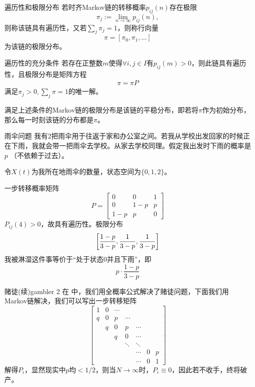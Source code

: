 \begin{definition}{遍历性和极限分布}{}
	若时齐Markov链的转移概率$p_{ij}(n)$存在极限
	\[
		\pi_j:=\lim_{n\to\infty}p_{ij}(n),
	\]
	则称该链具有遍历性，又若$\textstyle\sum_{j}\pi_j=1$，则称行向量
	\[
		\pi=[\pi_0,\pi_1,\ldots]
	\]
	为该链的极限分布。
\end{definition}
\begin{theorem}{遍历性的充分条件}{}
	若存在正整数$m$使得$\forall i,j\in I$有$p_{ij}(m)>0$，则此链具有遍历性，且极限分布是矩阵方程
	\begin{align}
		\pi=\pi P
	\end{align}
	满足$\pi_j>0,\textstyle\sum_j\pi=1$的唯一解。
\end{theorem}
满足上述条件的Markov链的极限分布是该链的平稳分布，即若将$\pi$作为初始分布，那么每一时刻该链的分布都是$\pi$。
\begin{example}{雨伞问题}{}
	我有2把雨伞用于往返于家和办公室之间。若我从学校出发回家的时候正在下雨，我就会带一把雨伞去学校。从家去学校同理。假定我出发时下雨的概率是$ p$ （不依赖于过去）。

	令$ X(t) $为我所在地雨伞的数量，状态空间为$\{0, 1, 2\}$。
	
	一步转移概率矩阵
	\[
		P=\begin{bmatrix}
			0&0&1\\
			0&1-p&p\\
			1-p&p&0
		\end{bmatrix}
	\]
	$P_{ij}(4)>0$，故具有遍历性。极限分布
	\[
		\biggl[\frac{1-p}{3-p},\frac1{3-p},\frac1{3-p}\biggr]
	\]
	我被淋湿这件事等价于“处于状态0并且下雨”，即
	\[
		p\cdot\frac{1-p}{3-p}
	\]
\end{example}
\begin{example}{赌徒(续)}{gambler 2}
	在 中，我们用全概率公式解决了赌徒问题，下面我们用Markov链解决，我们可以写出一步转移矩阵
	\[
		\begin{bmatrix}
			1&0&\cdots\\
			q&0&p&\cdots\\
			&q&0&p&\cdots\\
			&&q&0&\cdots\\
			&&&\ddots&\ddots\\
			&&&&\cdots&0&p\\
			&&&&\cdots&0&1
		\end{bmatrix}
	\]
	解得$P_i$，显然现实中$p$均$<1/2$，则当$N\to\infty$时，$P_i\equiv 0$，因此若不收手，终将破产。
\end{example}
